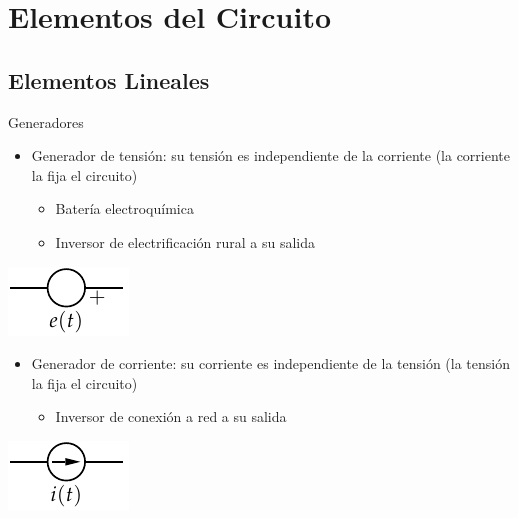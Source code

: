 \documentclass[xcolor={usenames,svgnames,dvipsnames}]{beamer}
\begin{document}
\section{Elementos del Circuito}
\label{sec:orgf782fde}
\subsection{Elementos Lineales}
\label{sec:orgefa1ccd}

\begin{frame}[label={sec:org2f0533d}]{Generadores}
\begin{itemize}
\item \alert{Generador de tensión}: su tensión es independiente de la corriente
(la corriente la fija el circuito)

\begin{itemize}
\item Batería electroquímica

\item Inversor de electrificación rural a su salida
\end{itemize}
\end{itemize}
\begin{center}
\includegraphics[height=0.2\textheight]{../figs/GeneradorTension.pdf}
\end{center}

\begin{itemize}
\item \alert{Generador de corriente}: su corriente es independiente de la tensión
(la tensión la fija el circuito)

\begin{itemize}
\item Inversor de conexión a red a su salida
\end{itemize}
\end{itemize}
\begin{center}
\includegraphics[height=0.2\textheight]{../figs/GeneradorCorriente.pdf}
\end{center}
\end{frame}
\end{document}
